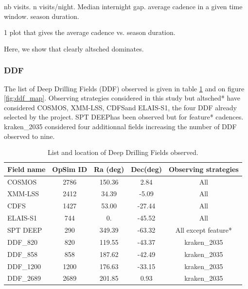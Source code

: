 \documentclass [11pt,a4paper]{article}
\newcommand{\cosmos}{COSMOS}
\newcommand{\xmmlss}{XMM-LSS}
\newcommand{\cdfs}{CDFS}
\newcommand{\elais}{ELAIS-S1}
\newcommand{\spt}{SPT DEEP}
\newcommand{\ddfa}{DDF\_820}
\newcommand{\ddfb}{DDF\_858}
\newcommand{\ddfc}{DDF\_1200}
\newcommand{\ddfd}{DDF\_2689}
\begin{document}
nb visits. n visits/night. Median internight gap. average cadence in a given time window. season duration. 

1 plot that gives the average cadence vs. season duration. 

Here, we show that clearly altsched dominates. 



\subsubsection{DDF}

The list of Deep Drilling Fields (DDF) observed is given in table
\ref{tab:ddf_list} and on figure \ref{fig:ddf_map}. Observing
strategies considered in this study but altsched* have considered
\cosmos, \xmmlss, \cdfs and \elais, the four DDF already selected by
the project. \spt has been observed but for feature*
cadences. kraken\_2035 considered four additionnal fields increasing
the number of DDF observed to nine.

\begin{table}[!htbp]
  \begin{center}
  \begin{tabular}{|l|c|c|c|c|}
    \hline
    Field name & OpSim ID & Ra (deg) & Dec(deg) & Observing strategies\\
    \hline
    \cosmos & 2786 & 150.36 & 2.84 &All \\
    \xmmlss & 2412 & 34.39 & -5.09 & All \\
    \cdfs & 1427 & 53.00 & -27.44 & All \\
    \elais & 744 & 0.  & -45.52 & All \\
    \spt & 290 & 349.39 & -63.32 & All except feature*\\
    \ddfa & 820 & 119.55 & -43.37 & kraken\_2035\\
    \ddfb & 858 & 187.62 & -42.49 & kraken\_2035\\
    \ddfc & 1200 & 176.63 & -33.15 & kraken\_2035\\
    \ddfd & 2689 & 201.85 & 0.93 & kraken\_2035\\
    \hline
  \end{tabular}
  \caption{List and location of Deep Drilling Fields observed.}\label{tab:ddf_list}
  \end{center}
\end{table}
\end{document}
